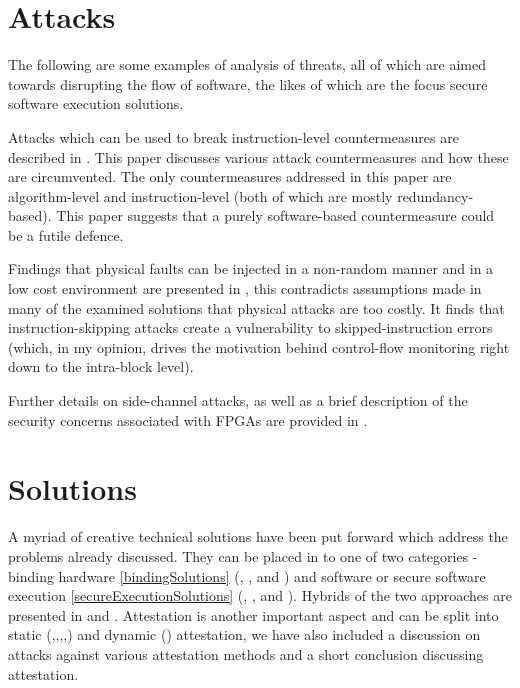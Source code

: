 \section{Attacks}

The following are some examples of analysis of threats, all of which are aimed towards disrupting the flow of software, the likes of which are the focus secure software execution solutions. 

Attacks which can be used to break instruction-level countermeasures are described in \cite{Yuce2016a}. This paper discusses various attack countermeasures and how these are circumvented. The only countermeasures addressed in this paper are algorithm-level and instruction-level (both of which are mostly redundancy-based). This paper suggests that a purely software-based countermeasure could be a futile defence.

Findings that physical faults can be injected in a non-random manner and in a low cost environment are presented in \cite{Kelly2017}, this contradicts assumptions made in many of the examined solutions that physical attacks are too costly. It finds that instruction-skipping attacks create a vulnerability to skipped-instruction errors (which, in my opinion, drives the motivation behind control-flow monitoring right down to the intra-block level).

Further details on side-channel attacks, as well as a brief description of the security concerns associated with FPGAs are provided in \cite{GebotysCatherineH2010Sied}.

\section{Solutions} \label{solutionsDescriptions}

A myriad of creative technical solutions have been put forward which address the problems already discussed. They can be placed in to one of two categories - binding hardware \ref{bindingSolutions} (\cite{Lee2016}, \cite{Schaller2014}, \cite{Gora2010} and \cite{Simpson2006}) and software or secure software execution \ref{secureExecutionSolutions} (\cite{Werner2016}, \cite{Wang2016}, \cite{Abera2016} and \cite{Arora2006}). Hybrids of the two approaches are presented in \cite{Kleber2015} and \cite{Kohnhauser2015}. Attestation is another important aspect and can be split into static (\cite{For},\cite{Li2011},\cite{Seshadri2007},\cite{Seshadri2004},\cite{AbuHmed2009}) and dynamic (\cite{Kil2009}) attestation, we have also included a discussion on attacks against various attestation methods\cite{Castelluccia2009} and a short conclusion discussing attestation.


